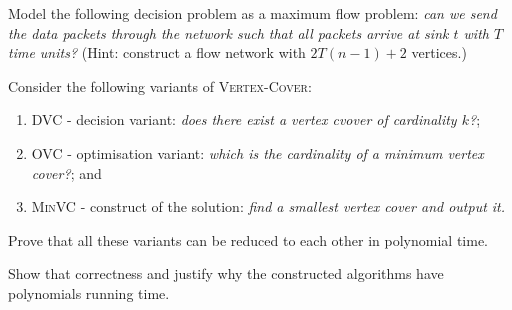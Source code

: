 Model the following decision problem as a maximum flow problem: 
\emph{can we send the data packets through the network such that all packets arrive at sink $t$ with $T$ time units?}
(Hint: construct a flow network with $2T(n-1) + 2$ vertices.)

\question Consider the following variants of \textsc{Vertex-Cover}:
\begin{enumerate}
    \item DVC - decision variant: 
        \emph{does there exist a vertex cvover of cardinality $k$?};
    \item OVC - optimisation variant:
        \emph{which is the cardinality of a minimum vertex cover?}; and
    \item \textsc{Min}VC - construct of the solution:
        \emph{find a smallest vertex cover and output it.}
\end{enumerate}
Prove that all these variants can be reduced to each other in polynomial time.
Show that correctness and justify why the constructed algorithms have polynomials running time.

